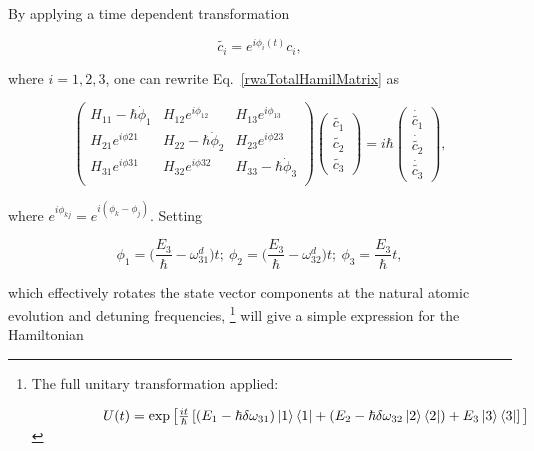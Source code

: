   \noindent By applying a time dependent transformation
  
  \begin{equation}
  \label{eqn:InteractionTransformation}
  \widetilde{c_i} = e^{i\phi_{i}(t)}c_i,
  \end{equation}
  
  \noindent where $ i=1,2,3 $, one can rewrite Eq.~\eqref{rwaTotalHamilMatrix} as
  
  \begin{equation}
	  \begin{pmatrix}
	  H_{11}-\hbar\dot{\phi}_1 & H_{12}e^{i\phi_{12}} & H_{13}e^{i\phi_{13}} \\  H_{21}e^{i\phi{21}} & H_{22}-\hbar\dot{\phi}_2 & H_{23}e^{i\phi{23}} \\   	H_{31}e^{i\phi{31}} & H_{32}e^{i\phi{32}} & H_{33}-\hbar\dot{\phi}_3 \\
	  \end{pmatrix}\begin{pmatrix}
	  \widetilde{c_1}\\\widetilde{c_2}\\\widetilde{c_3}
	  \end{pmatrix} = i\hbar\begin{pmatrix}
	  \dot{\widetilde{c_1}} \\ \dot{\widetilde{c_2}}\\\dot{\widetilde{c_3}}
	  \end{pmatrix},
	  \label{rawMatrixAfterTransformation}
  \end{equation}
  
  \noindent where $ e^{i\phi_{kj}} = e^{i(\phi_k-\phi_j)} $. Setting 
  
  \begin{equation}
  	\phi_1 = \bigg(\frac{E_3}{\hbar}- \omega_{31}^d\bigg)t;\ \phi_2=\bigg(\frac{E_3}{\hbar}- \omega_{32}^d\bigg)t;\ \phi_3 = \frac{E_3}{\hbar}t,
  	\label{rwaTransfomration}
  \end{equation}
  
  \noindent which effectively rotates the state vector components at the natural atomic evolution and detuning frequencies, \footnote{The full unitary transformation applied:
  	
  	$\qquad\qquad\quad U(t) = \exp\big[\frac{it}{\hbar}\left[({E_1}- \hbar\delta\omega_{31})\ket{1}\bra{1}+({E_2}- \hbar\delta\omega_{32}\ket{2}\bra{2})+E_{3}\ket{3}\bra{3}\right]\big] $} will give a simple expression for the Hamiltonian
  
